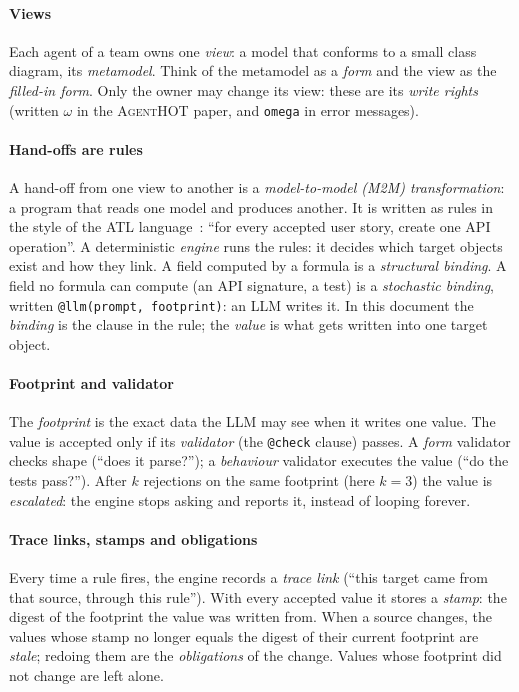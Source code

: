 \documentclass[10pt,a4paper]{article}
\newcommand{\tool}{\textsc{AgentHOT}}
\newcommand{\code}[1]{\texttt{#1}}
\begin{document}
\paragraph{Views} Each agent of a team owns one \emph{view}: a model that
conforms to a small class diagram, its \emph{metamodel}. Think of the
metamodel as a \emph{form} and the view as the \emph{filled-in form}. Only
the owner may change its view: these are its \emph{write rights} (written
$\omega$ in the \tool{} paper, and \code{omega} in error messages).

\paragraph{Hand-offs are rules} A hand-off from one view to another is a
\emph{model-to-model (M2M) transformation}: a program that reads one model and
produces another. It is written as rules in the style of the ATL
language~\cite{jouault2008atl}: ``for every accepted user story, create one
API operation''. A deterministic \emph{engine} runs the rules: it decides
which target objects exist and how they link. A field computed by a formula
is a \emph{structural binding}. A field no formula can compute (an API
signature, a test) is a \emph{stochastic binding}, written
\code{@llm(prompt, footprint)}: an LLM writes it. In this document the
\emph{binding} is the clause in the rule; the \emph{value} is what gets
written into one target object.

\paragraph{Footprint and validator} The \emph{footprint} is the exact data
the LLM may see when it writes one value. The value is accepted only if its
\emph{validator} (the \code{@check} clause) passes. A \emph{form} validator
checks shape (``does it parse?''); a \emph{behaviour} validator executes the
value (``do the tests pass?''). After $k$ rejections on the same footprint
(here $k=3$) the value is \emph{escalated}: the engine stops asking and
reports it, instead of looping forever.

\paragraph{Trace links, stamps and obligations} Every time a rule fires, the
engine records a \emph{trace link} (``this target came from that source,
through this rule''). With every accepted value it stores a \emph{stamp}:
the digest of the footprint the value was written from. When a source
changes, the values whose stamp no longer equals the digest of their
current footprint are \emph{stale}; redoing them are the
\emph{obligations} of the change. Values whose footprint did not change are
left alone.
\end{document}
